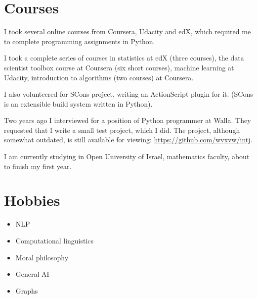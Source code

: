 \documentclass[11pt]{article}
\begin{document}
\section{Courses}
\label{sec:orgheadline8}
I took several online courses from Coursera, Udacity and edX, which required
me to complete programming assignments in Python.

I took a complete series of courses in statistics at edX (three courses),
the data scientist toolbox course at Coursera (six short courses), machine
learning at Udacity, introduction to algorithms (two courses) at Coursera.

I also volunteered for SCons project, writing an ActionScript plugin for it.
(SCons is an extensible build system written in Python).

Two years ago I interviewed for a position of Python programmer at Walla.
They requested that I write a small test project, which I did.  The project,
although somewhat outdated, is still available for viewing:
\url{https://github.com/wvxvw/intj}.

I am currently studying in Open University of Israel, mathematics faculty,
about to finish my first year.

\section{Hobbies}
\label{sec:orgheadline9}
\begin{itemize}
\item NLP
\item Computational linguistics
\item Moral philosophy
\item General AI
\item Graphs
\end{itemize}
\end{document}
